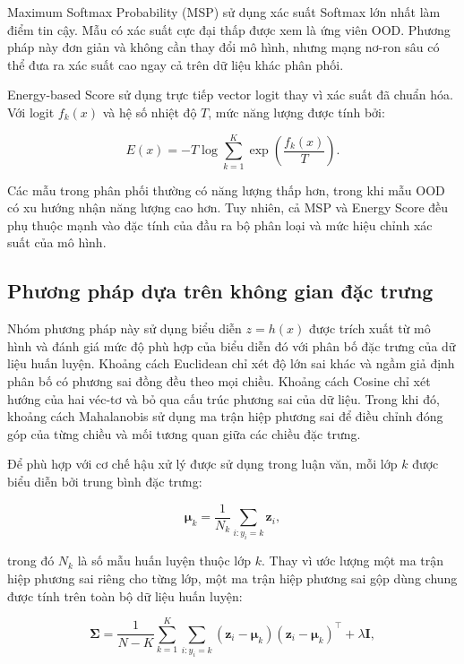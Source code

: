 Maximum Softmax Probability (MSP) sử dụng xác suất Softmax lớn nhất làm điểm tin cậy. Mẫu có xác suất cực đại thấp được xem là ứng viên OOD. Phương pháp này đơn giản và không cần thay đổi mô hình, nhưng mạng nơ-ron sâu có thể đưa ra xác suất cao ngay cả trên dữ liệu khác phân phối.

Energy-based Score sử dụng trực tiếp vector logit thay vì xác suất đã chuẩn hóa. Với logit $f_k(x)$ và hệ số nhiệt độ $T$, mức năng lượng được tính bởi:

\begin{equation}
E(x) = -T\log\sum_{k=1}^{K}
\exp\left(\frac{f_k(x)}{T}\right).
\label{eq:energy_score}
\end{equation}

Các mẫu trong phân phối thường có năng lượng thấp hơn, trong khi mẫu OOD có xu hướng nhận năng lượng cao hơn. Tuy nhiên, cả MSP và Energy Score đều phụ thuộc mạnh vào đặc tính của đầu ra bộ phân loại và mức hiệu chỉnh xác suất của mô hình.

\subsection{Phương pháp dựa trên không gian đặc trưng}

Nhóm phương pháp này sử dụng biểu diễn $z=h(x)$ được trích xuất từ mô hình và đánh giá mức độ phù hợp của biểu diễn đó với phân bố đặc trưng của dữ liệu huấn luyện. Khoảng cách Euclidean chỉ xét độ lớn sai khác và ngầm giả định phân bố có phương sai đồng đều theo mọi chiều. Khoảng cách Cosine chỉ xét hướng của hai véc-tơ và bỏ qua cấu trúc phương sai của dữ liệu. Trong khi đó, khoảng cách Mahalanobis sử dụng ma trận hiệp phương sai để điều chỉnh đóng góp của từng chiều và mối tương quan giữa các chiều đặc trưng.

Để phù hợp với cơ chế hậu xử lý được sử dụng trong luận văn, mỗi lớp $k$ được biểu diễn bởi trung bình đặc trưng:

\begin{equation}
\boldsymbol{\mu}_k
= \frac{1}{N_k}
\sum_{i:y_i=k}\boldsymbol{z}_i,
\label{eq:maha_mean}
\end{equation}

trong đó $N_k$ là số mẫu huấn luyện thuộc lớp $k$. Thay vì ước lượng một ma trận hiệp phương sai riêng cho từng lớp, một ma trận hiệp phương sai gộp dùng chung được tính trên toàn bộ dữ liệu huấn luyện:

\begin{equation}
\boldsymbol{\Sigma}
= \frac{1}{N-K}
\sum_{k=1}^{K}
\sum_{i:y_i=k}
(\boldsymbol{z}_i-\boldsymbol{\mu}_k)
(\boldsymbol{z}_i-\boldsymbol{\mu}_k)^{\top}
+ \lambda\boldsymbol{I},
\label{eq:maha_cov}
\end{equation}

